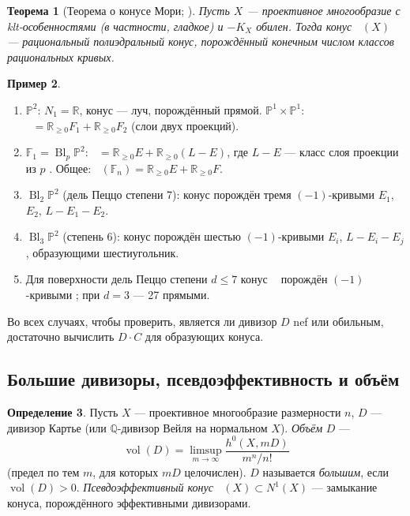 \documentclass[11pt,a4paper]{article}
\theoremstyle{plain}
\newtheorem{theorem}{Теорема}[section]
\theoremstyle{definition}
\newtheorem{definition}[theorem]{Определение}
\newtheorem{example}[theorem]{Пример}
\theoremstyle{remark}
\newcommand{\Q}{\mathbb{Q}}
\newcommand{\R}{\mathbb{R}}
\newcommand{\PP}{\mathbb{P}}
\DeclareMathOperator{\Bl}{Bl}
\DeclareMathOperator{\NE}{\overline{NE}}
\DeclareMathOperator{\vol}{vol}
\DeclareMathOperator{\Eff}{\overline{Eff}}
\begin{document}
\begin{theorem}[{Теорема о конусе Мори; \cite[1.24, 3.7]{KM}}]\label{thm:cone}
Пусть $X$ --- проективное многообразие с klt-особенностями (в частности, гладкое) и $-K_X$ обилен.
Тогда конус $\NE(X)$ --- рациональный полиэдральный конус, порождённый конечным числом классов
рациональных кривых.
\end{theorem}

\begin{example}\label{ex:cones}
\begin{enumerate}
\item $\PP^2$: $N_1=\R$, конус --- луч, порождённый прямой. $\PP^1\times\PP^1$: $\NE=\R_{\ge0}F_1+\R_{\ge0}F_2$
(слои двух проекций).
\item $\mathbb F_1=\Bl_p\PP^2$: $\NE=\R_{\ge0}E+\R_{\ge0}(L-E)$, где $L-E$ --- класс слоя
проекции из $p$ \cite[пример~6.3(3)]{AG}. Общее: $\NE(\mathbb F_n)=\R_{\ge0}E+\R_{\ge0}F$.
\item $\Bl_2\PP^2$ (дель Пеццо степени 7): конус порождён тремя $(-1)$-кривыми $E_1$, $E_2$,
$L-E_1-E_2$.
\item $\Bl_3\PP^2$ (степень 6): конус порождён шестью $(-1)$-кривыми $E_i$, $L-E_i-E_j$,
образующими шестиугольник.
\item Для поверхности дель Пеццо степени $d\le7$ конус $\NE$ порождён $(-1)$-кривыми
\cite[8.2]{Do}; при $d=3$ --- 27 прямыми.
\end{enumerate}
Во всех случаях, чтобы проверить, является ли дивизор $D$ nef или обильным, достаточно вычислить
$D\cdot C$ для образующих конуса.
\end{example}

\subsection{Большие дивизоры, псевдоэффективность и объём}\label{ss:volume}

\begin{definition}\label{def:big}
Пусть $X$ --- проективное многообразие размерности $n$, $D$ --- дивизор Картье (или $\Q$-дивизор
Вейля на нормальном $X$). \emph{Объём} $D$ ---
\[
\vol(D)=\limsup_{m\to\infty}\frac{h^0(X,mD)}{m^n/n!}
\]
(предел по тем $m$, для которых $mD$ целочислен). $D$ называется \emph{большим}, если
$\vol(D)>0$. \emph{Псевдоэффективный конус} $\Eff(X)\subset N^1(X)$ --- замыкание конуса,
порождённого эффективными дивизорами.
\end{definition}
\end{document}
